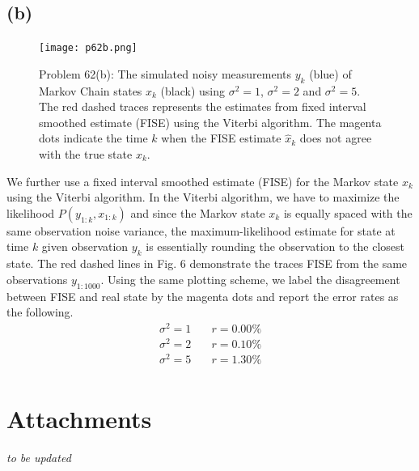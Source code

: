 \documentclass[a4paper, 11pt]{article}
\begin{document}
\subsection*{(b)}

\begin{figure}
	\begin{center}
		\texttt{[image: p62b.png]}
		\caption{Problem 62(b): The simulated noisy measurements $y_k$ (blue) of Markov Chain states $x_k$ (black) using $\sigma^2=1$, $\sigma^2=2$ and $\sigma^2=5$. The red dashed traces represents the estimates from fixed interval smoothed estimate (FISE) using the Viterbi algorithm. The magenta dots indicate the time $k$ when the FISE estimate $\hat{x}_k$ does not agree with the true state $x_k$. } 
	\end{center}
\end{figure}

We further use a fixed interval smoothed estimate (FISE) for the Markov state $x_k$ using the Viterbi algorithm. In the Viterbi algorithm, we have to maximize the likelihood $P(y_{1:k}, x_{1:k})$ and since the Markov state $x_k$ is equally spaced with the same observation noise variance, the maximum-likelihood estimate for state at time $k$ given observation $y_k$ is essentially rounding the observation to the closest state. The red dashed lines in Fig. 6 demonstrate the traces FISE from the same observations $y_{1:1000}$. Using the same plotting scheme, we label the disagreement between FISE and real state by the magenta dots and report the error rates as the following. 
\begin{equation}
\begin{split}
\sigma^2 = 1 \quad & r = 0.00\% \\
\sigma^2 = 2 \quad & r = 0.10\% \\
\sigma^2 = 5 \quad & r = 1.30\% \\
\end{split}
\end{equation}


\section*{Attachments}
\textit{to be updated}
\end{document}
